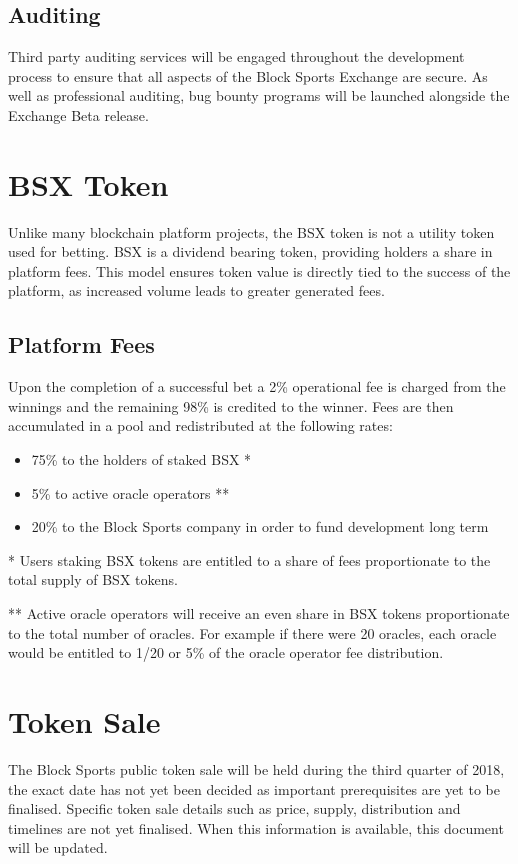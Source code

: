 \documentclass{article}
\begin{document}
	\subsection{Auditing}
Third party auditing services will be engaged throughout the development process to ensure that all aspects of the Block Sports Exchange are secure. As well as professional auditing,
bug bounty programs will be launched alongside the Exchange Beta release.

\section{BSX Token}

Unlike many blockchain platform projects, the BSX token is not a utility token used for betting. BSX is a dividend bearing token, providing holders a share in platform fees. This model ensures token value is directly tied to the success of the platform, as increased volume leads to greater generated fees.

	\subsection{Platform Fees}
Upon the completion of a successful bet a 2\% operational fee is charged from the winnings and the remaining 98\% is credited to the winner. Fees are then accumulated in a pool and redistributed at the following rates:

\begin{itemize}
	\item 75\% to the holders of staked BSX *
	\item 5\% to active oracle operators **
	\item 20\% to the Block Sports company in order to fund development long term

\end{itemize}

* Users staking BSX tokens are entitled to a share of fees proportionate to the total supply of BSX tokens.

** Active oracle operators will receive an even share in BSX tokens proportionate to the total number of oracles. For example if there were 20 oracles, each oracle would be entitled to 1/20 or 5\% of the oracle operator fee distribution.

\section{Token Sale}
The Block Sports public token sale will be held during the third quarter of 2018, the exact date has not yet been decided as important prerequisites are yet to be finalised. Specific token sale details such as price, supply, distribution and timelines are not yet finalised. When this information is available, this document will be updated.
\end{document}
